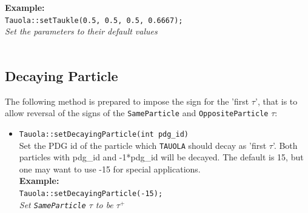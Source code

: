 \documentclass[]{Tauola_interface_design}
\begin{document}
\begin{itemize}
\noindent
\textbf{Example:} \hfill \\
 {\tt Tauola::setTaukle(0.5, 0.5, 0.5, 0.6667);} \\
\emph{ Set the parameters to their default values}\hfill \\


 \hfill \\
\end{itemize}

\subsection{Decaying Particle}

The following method is prepared to impose the sign for the 'first $\tau$', that is
to allow reversal of the signs of the {\tt SameParticle} and {\tt OppositeParticle} $\tau$:
\begin{itemize}
\item {\tt Tauola::setDecayingParticle(int pdg\_id) } \hfill \\
  Set the PDG id of the particle which {\tt TAUOLA} should decay as 'first $\tau$'.
  Both particles with pdg\_id and -1*pdg\_id will be decayed. 
  The default is 15, but one may want to use -15 for special applications.\\


\noindent \textbf{Example:} \hfill \\
  {\tt Tauola::setDecayingParticle(-15); } \\
\emph{Set {\tt SameParticle} $\tau$ to be $\tau^+$}
\hfill \\
\end{itemize}
\end{document}
